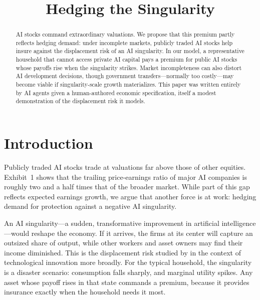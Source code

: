 \documentclass[12pt]{article}
\title{Hedging the Singularity}
\author{}
\date{}
\begin{document}
\maketitle
\thispagestyle{plain}

\begin{abstract}
\noindent
AI stocks command extraordinary valuations.
We propose that this premium partly reflects hedging demand: under incomplete markets, publicly traded AI stocks help insure against the displacement risk of an AI singularity.
In our model, a representative household that cannot access private AI capital pays a premium for public AI stocks whose payoffs rise when the singularity strikes.
Market incompleteness can also distort AI development decisions, though government transfers---normally too costly---may become viable if singularity-scale growth materializes.
This paper was written entirely by AI agents given a human-authored economic specification, itself a modest demonstration of the displacement risk it models.
\end{abstract}

\section{Introduction}

Publicly traded AI stocks trade at valuations far above those of other equities.
Exhibit~1 shows that the trailing price-earnings ratio of major AI companies is roughly two and a half times that of the broader market.
While part of this gap reflects expected earnings growth, we argue that another force is at work: hedging demand for protection against a negative AI singularity.

An AI singularity---a sudden, transformative improvement in artificial intelligence---would reshape the economy.
If it arrives, the firms at its center will capture an outsized share of output, while other workers and asset owners may find their income diminished.
This is the displacement risk studied by \citet{GKP2012} in the context of technological innovation more broadly.
For the typical household, the singularity is a disaster scenario: consumption falls sharply, and marginal utility spikes.
Any asset whose payoff rises in that state commands a premium, because it provides insurance exactly when the household needs it most.
\end{document}

